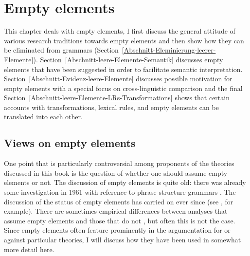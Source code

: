 
\chapter{Empty elements}
\label{Abschnitt-Diskussion-leere-Elemente}
\label{chap-empty}

This chapter deals with empty elements, I first discuss the general attitude of various research
traditions towards empty elements and then show how they can be eliminated from grammars
(Section~\ref{Abschnitt-Eleminierung-leerer-Elemente}). Section~\ref{Abschnitt-leere-Elemente-Semantik} discusses empty elements that
have been suggested in order to facilitate semantic
interpretation. Section~\ref{Abschnitt-Evidenz-leere-Elemente} discusses possible motivation for
empty elements with a special focus on cross-linguistic comparison and the final Section~\ref{Abschnitt-leere-Elemente-LRs-Transformations} shows
that certain accounts with transformations, lexical rules, and empty elements can be translated into each other.

\section{Views on empty elements}

One point that is particularly controversial among proponents of the theories discussed in this book is the question of whether
one should assume empty elements or not. The discussion of empty elements is quite old: there was already some investigation in 1961 with reference
to phrase structure grammars \citep*{BHPS61a}.
The discussion of the status of empty elements has carried on ever since (see
\citealp*{Loebner86a,Wunderlich87d,Wunderlich89,Stechow89,Haider97a,Sag2000a,BMS2001a,LH2006a,Mueller2004e,AS2015a}, for example). 
There are sometimes empirical differences between analyses that assume empty elements and those that
do not \citep{AS2015a}, but often this is not the case. Since empty elements often feature prominently in the argumentation for or against particular theories, I will discuss
how they have been used in somewhat more detail here.

